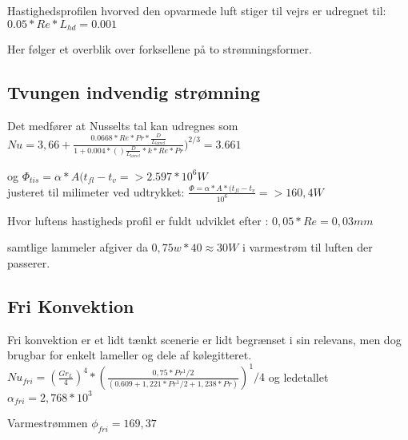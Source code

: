 Hastighedsprofilen hvorved den opvarmede luft stiger til vejrs er udregnet til: 
$0.05*Re*L_{hd} = 0.001 $

Her følger et overblik over forksellene på to strømningsformer.

\subsection{Tvungen indvendig strømning}
Det medfører at Nusselts tal kan udregnes som \\ 
$Nu = 3,66+ \frac{0.0668*Re*Pr*\frac{D}{L_{lamel}}}{1+0.004*()\frac{D}{L_{lamel}}*k *Re*Pr})^{2/3} = 3.661$



og $ \Phi_{tis} = \alpha*A(t_{fl}-t_v =>2.597*10^6 W $\\ 
justeret til milimeter ved udtrykket: $\frac{\Phi = \alpha*A*(t_{fl}-t_v}{10^6} =>160,4 W$

Hvor luftens hastigheds profil er fuldt udviklet efter :
$0,05*Re = 0,03 mm$

samtlige lammeler afgiver da $0,75 w* 40 \approx 30 W$ i varmestrøm til luften der passerer. 

\subsection{Fri Konvektion}

Fri konvektion er et lidt tænkt scenerie er lidt begrænset i sin relevans, men dog brugbar for enkelt lameller og dele af kølegitteret.
$Nu_{fri} = (\frac{Gr_{L}}{4})^4 * (\frac{0,75*Pr^1/2}{(0.609+1,221*Pr^1/2+1,238*Pr)})^1/4$
og ledetallet $\alpha_{fri} = 2,768*10^3$

Varmestrømmen $\phi_{fri}=169,37$  






